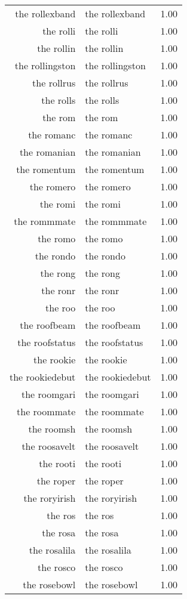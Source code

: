 \begin{table}[ht]
\begin{tabular}{rlr}
  the rollexband & the rollexband & 1.00 \\ 
  the rolli & the rolli & 1.00 \\ 
  the rollin & the rollin & 1.00 \\ 
  the rollingston & the rollingston & 1.00 \\ 
  the rollrus & the rollrus & 1.00 \\ 
  the rolls & the rolls & 1.00 \\ 
  the rom & the rom & 1.00 \\ 
  the romanc & the romanc & 1.00 \\ 
  the romanian & the romanian & 1.00 \\ 
  the romentum & the romentum & 1.00 \\ 
  the romero & the romero & 1.00 \\ 
  the romi & the romi & 1.00 \\ 
  the rommmate & the rommmate & 1.00 \\ 
  the romo & the romo & 1.00 \\ 
  the rondo & the rondo & 1.00 \\ 
  the rong & the rong & 1.00 \\ 
  the ronr & the ronr & 1.00 \\ 
  the roo & the roo & 1.00 \\ 
  the roofbeam & the roofbeam & 1.00 \\ 
  the roofstatus & the roofstatus & 1.00 \\ 
  the rookie & the rookie & 1.00 \\ 
  the rookiedebut & the rookiedebut & 1.00 \\ 
  the roomgari & the roomgari & 1.00 \\ 
  the roommate & the roommate & 1.00 \\ 
  the roomsh & the roomsh & 1.00 \\ 
  the roosavelt & the roosavelt & 1.00 \\ 
  the rooti & the rooti & 1.00 \\ 
  the roper & the roper & 1.00 \\ 
  the roryirish & the roryirish & 1.00 \\ 
  the ros & the ros & 1.00 \\ 
  the rosa & the rosa & 1.00 \\ 
  the rosalila & the rosalila & 1.00 \\ 
  the rosco & the rosco & 1.00 \\ 
  the rosebowl & the rosebowl & 1.00 \\ 

\end{tabular}
\end{table}
